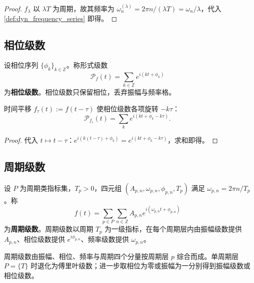 \begin{proof}
$f_\lambda$ 以 $\lambda T$ 为周期，故其频率为 $\omega_n^{(\lambda)}=2\pi n/(\lambda T)=\omega_n/\lambda$，代入 \cref{def:dyn_frequency_series} 即得。
\end{proof}

\subsection{相位级数}

\begin{definition}[相位级数（回顾）]\label{def:dyn_phase_series}
设相位序列 $\{\phi_k\}_{k\in\mathbb Z}$。称形式级数
\[
\mathcal P_f(t)=\sum_{k\in\mathbb Z}e^{i(kt+\phi_k)}
\]
为\textbf{相位级数}。相位级数只保留相位，丢弃振幅与频率格。
\end{definition}

\begin{proposition}[相位级数与时间平移（回顾）]\label{prop:dyn_phase_translation}
时间平移 $f_\tau(t):=f(t-\tau)$ 使相位级数各项旋转 $-k\tau$：
\[
\mathcal P_{f_\tau}(t)=\sum_k e^{i(kt+\phi_k-k\tau)}.
\]
\end{proposition}

\begin{proof}
代入 $t\mapsto t-\tau$：$e^{i(k(t-\tau)+\phi_k)}=e^{i(kt+\phi_k-k\tau)}$，求和即得。
\end{proof}

\subsection{周期级数}

\begin{definition}[周期级数（回顾）]\label{def:dyn_periodic_series}
设 $P$ 为周期类指标集，$T_p>0$，四元组 $(A_{p,n},\omega_{p,n},\phi_{p,n},T_p)$ 满足 $\omega_{p,n}=2\pi n/T_p$。称
\[
f(t)=\sum_{p\in P}\sum_{n\in\mathbb Z}A_{p,n}e^{i(\omega_{p,n}t+\phi_{p,n})}
\]
为\textbf{周期级数}。周期级数以周期 $T_p$ 为一级指标，在每个周期层内由振幅级数提供 $A_{p,n}$、相位级数提供 $e^{i\phi_{p,n}}$、频率级数提供 $\omega_{p,n}$。
\end{definition}

\begin{proposition}[周期级数是四级数的综合（回顾）]\label{prop:dyn_periodic_synthesis}
周期级数由振幅、相位、频率与周期四个分量按周期层 $p$ 综合而成。单周期层 $P=\{T\}$ 时退化为傅里叶级数；进一步取相位为零或振幅为一分别得到振幅级数或相位级数。
\end{proposition}

